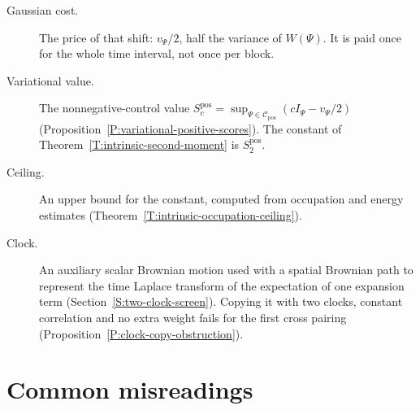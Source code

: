 \begin{description}
  \item[Gaussian cost.] The price of that shift: $v_\Psi/2$, half the variance
    of $W(\Psi)$. It is paid once for the whole time interval, not once per
    block.
  \item[Variational value.] The nonnegative-control value
    $S_c^{\mathrm{pos}}=\sup_{\Psi\in\mathcal{C}_{\mathrm{pos}}}
    (cI_\Psi-v_\Psi/2)$ (Proposition~\ref{P:variational-positive-scores}).
    The constant of Theorem~\ref{T:intrinsic-second-moment} is $S_2^{\mathrm{pos}}$.
  \item[Ceiling.] An upper bound for the constant, computed from occupation
    and energy estimates (Theorem~\ref{T:intrinsic-occupation-ceiling}).
  \item[Clock.] An auxiliary scalar Brownian motion used with a spatial
    Brownian path to represent the time Laplace transform of the expectation
    of one expansion term (Section~\ref{S:two-clock-screen}). Copying it with
    two clocks, constant correlation and no extra weight fails for the first
    cross pairing (Proposition~\ref{P:clock-copy-obstruction}).
\end{description}

\section*{Common misreadings}

